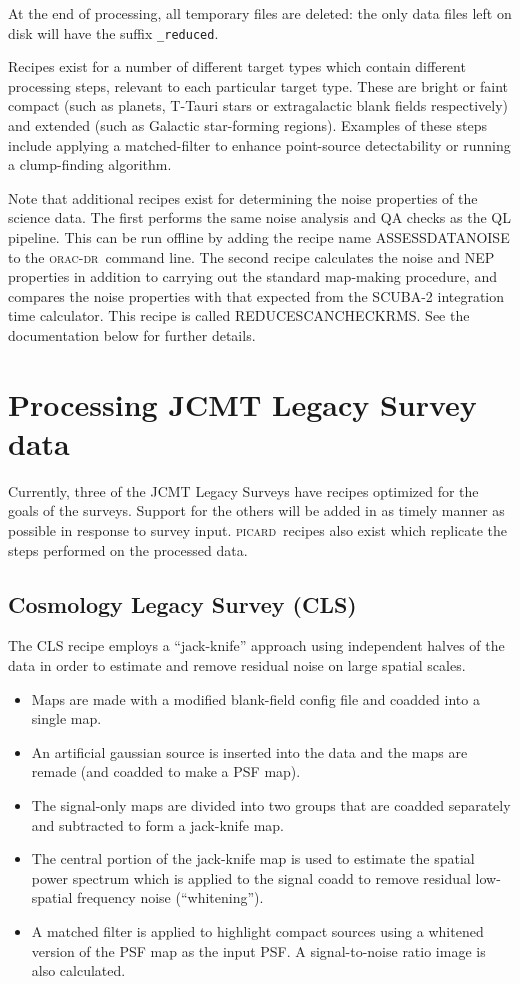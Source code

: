 \documentclass[twoside,11pt]{article}
\newcommand{\xlabel}[1]{}
\renewcommand{\_}{\texttt{\symbol{95}}}
\newcommand{\oracdr}{\textsc{orac-dr}}
\newcommand{\picard}{\textsc{picard}}
\begin{document}
At the end of processing, all temporary files are deleted: the only
data files left on disk will have the suffix \verb+_reduced+.

Recipes exist for a number of different target types which contain
different processing steps, relevant to each particular target
type. These are bright or faint compact (such as planets, T-Tauri
stars or extragalactic blank fields respectively) and extended (such
as Galactic star-forming regions). Examples of these steps include
applying a matched-filter to enhance point-source detectability or
running a clump-finding algorithm.

Note that additional recipes exist for determining the noise
properties of the science data. The first performs the same noise
analysis and QA checks as the QL pipeline. This can be run offline by
adding the recipe name ASSESS\_DATA\_NOISE to the \oracdr\ command
line. The second recipe calculates the noise and NEP properties in
addition to carrying out the standard map-making procedure, and
compares the noise properties with that expected from the SCUBA-2
integration time calculator. This recipe is called
REDUCE\_SCAN\_CHECKRMS. See the documentation below for further
details.

\section{\xlabel{jlsrecipes}Processing JCMT Legacy Survey data\label{se:jlsrec}}

Currently, three of the JCMT Legacy Surveys have recipes optimized for
the goals of the surveys. Support for the others will be added in as
timely manner as possible in response to survey
input. \picard\ recipes also exist which replicate the steps performed
on the processed data.

\subsection{Cosmology Legacy Survey (CLS)}

The CLS recipe employs a ``jack-knife'' approach using independent
halves of the data in order to estimate and remove residual noise on
large spatial scales.

\begin{itemize}
\item Maps are made with a modified blank-field config file and
  coadded into a single map.
\item An artificial gaussian source is inserted into the data and the
  maps are remade (and coadded to make a PSF map).
\item The signal-only maps are divided into two groups that are
  coadded separately and subtracted to form a jack-knife map.
\item The central portion of the jack-knife map is used to estimate
  the spatial power spectrum which is applied to the signal coadd to
  remove residual low-spatial frequency noise (``whitening'').
\item A matched filter is applied to highlight compact sources using a
  whitened version of the PSF map as the input PSF. A signal-to-noise
  ratio image is also calculated.
\end{itemize}
\end{document}
